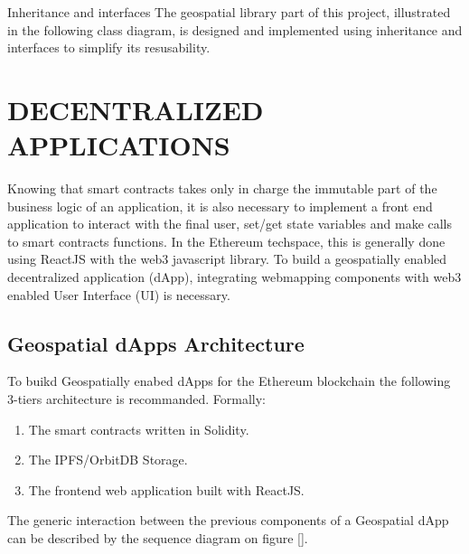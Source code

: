 \documentclass{isprs} %
\begin{document}
Inheritance and interfaces 
The geospatial library part of this project, illustrated in the following class diagram, is designed and implemented using inheritance and interfaces to simplify its resusability.


\newpage
\section{DECENTRALIZED APPLICATIONS}\label{sec:DECENTRALIZED APPLICATIONS}

Knowing that smart contracts takes only in charge the immutable part of the business logic of an application, it is also necessary to implement a front end application to interact with the final user, set/get state variables and make calls to smart contracts functions. In the Ethereum techspace, this is generally done using ReactJS with the web3 javascript library. To build a geospatially enabled decentralized application (dApp), integrating webmapping components with web3 enabled User Interface (UI) is necessary.
 
\subsection{Geospatial dApps Architecture}\label{sec:Geospatial dApps Architecture}

To buikd Geospatially enabed dApps for the Ethereum blockchain the following 3-tiers architecture is recommanded. Formally:

\begin{enumerate}
\setlength\itemsep{0em}\setlength\parskip{0em}\setlength\topsep{0em}\setlength\partopsep{0em}\setlength\parsep{0em} 
\item{The smart contracts written in Solidity.} 
\item{The IPFS/OrbitDB Storage.}
\item{The frontend web application built with ReactJS.}
\end{enumerate}

The generic interaction between the previous components of a Geospatial dApp can be described by the sequence diagram on figure [].
\end{document}
